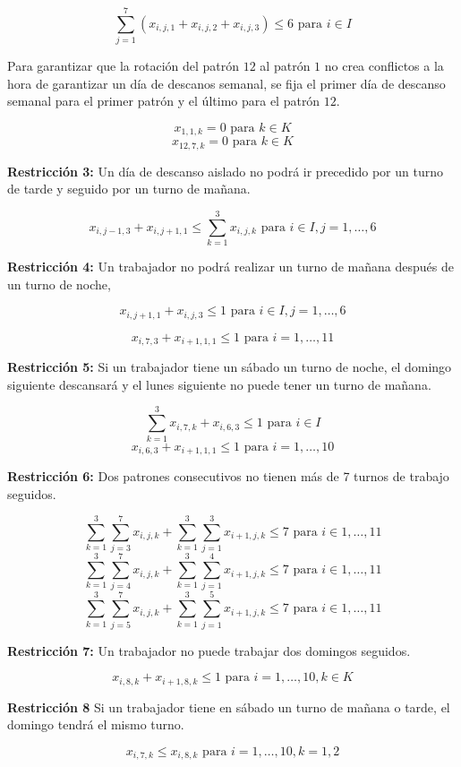 \documentclass[a4paper,12pt]{article}
\begin{document}
$$ \sum_{j=1}^{7}{(x_{i,j,1} + x_{i,j,2} + x_{i,j,3})} \leq 6  \text{ para } i\in I$$

Para garantizar que la rotaci\'on del patr\'on $12$ al patr\'on $1$ no crea conflictos a la hora de garantizar un d\'ia de descanos semanal, se fija el primer d\'ia de descanso semanal para el primer patr\'on y el \'ultimo para el patr\'on $12$.

$$ x_{1,1,k} = 0 \text{ para } k\in K$$
$$ x_{12,7,k} = 0 \text{ para } k\in K$$

\textbf{Restricci\'on 3:} Un d\'ia de descanso aislado no podr\'a ir precedido por un turno de tarde y seguido por un turno de mañana.

$$ x_{i,j-1,3} + x_{i,j+1,1} \leq \sum_{k=1}^{3} x_{i,j,k} \text{ para } i\in I, j=1,\dots,6$$


\textbf{Restricci\'on 4:} Un trabajador no podr\'a realizar un turno de mañana despu\'es de un turno de noche,

$$ x_{i,j+1,1} + x_{i,j,3} \leq 1 \text{ para } i\in I, j=1,\dots,6$$

$$ x_{i,7,3} + x_{i+1,1,1} \leq 1 \text{ para } i = 1,\dots,11$$

\textbf{Restricci\'on 5:} Si un trabajador tiene un s\'abado un turno de noche, el domingo siguiente descansar\'a y el lunes siguiente no puede tener un turno de mañana.

$$ \sum_{k=1}^{3} x_{i,7,k} + x_{i,6,3} \leq 1 \text{ para } i\in I$$
$$ x_{i,6,3} + x_{i+1,1,1} \leq 1 \text{ para } i = 1,\dots,10$$

\textbf{Restricci\'on 6:} Dos patrones consecutivos no tienen m\'as de 7 turnos de trabajo seguidos.

$$ \sum_{k=1}^{3} \sum_{j=3}^{7} {x_{i,j,k}} + \sum_{k=1}^{3} \sum_{j=1}^{3} {x_{i+1,j,k}} \leq 7 \text{ para } i\in {1,\dots,11}$$
$$ \sum_{k=1}^{3} \sum_{j=4}^{7} {x_{i,j,k}} + \sum_{k=1}^{3} \sum_{j=1}^{4} {x_{i+1,j,k}} \leq 7 \text{ para } i\in {1,\dots,11}$$
$$ \sum_{k=1}^{3} \sum_{j=5}^{7} {x_{i,j,k}} + \sum_{k=1}^{3} \sum_{j=1}^{5} {x_{i+1,j,k}} \leq 7 \text{ para } i\in {1,\dots,11}$$

\textbf{Restricci\'on 7:} Un trabajador no puede trabajar dos domingos seguidos.

$$ x_{i,8,k} + x_{i+1,8,k} \leq 1 \text{ para } i=1,\dots,10 , k\in K$$

\textbf{Restricci\'on 8} Si un trabajador tiene en s\'abado un turno de mañana o tarde, el domingo tendr\'a el mismo turno.

$$ x_{i,7,k} \leq x_{i,8,k} \text{ para } i=1,\dots,10, k=1,2$$
\end{document}
